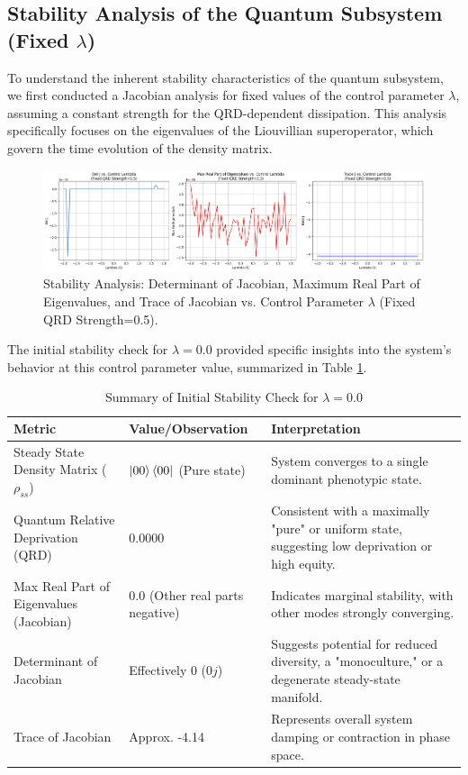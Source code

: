 \documentclass[9pt]{article}
\begin{document}
\subsection{Stability Analysis of the Quantum Subsystem (Fixed $\lambda$)}
To understand the inherent stability characteristics of the quantum subsystem, we first conducted a Jacobian analysis for fixed values of the control parameter $\lambda$, assuming a constant strength for the QRD-dependent dissipation. This analysis specifically focuses on the eigenvalues of the Liouvillian superoperator, which govern the time evolution of the density matrix.

\begin{figure}[h!]
    \centering
    \includegraphics[width=\textwidth]{phenotourfig1.png}
    \caption{Stability Analysis: Determinant of Jacobian, Maximum Real Part of Eigenvalues, and Trace of Jacobian vs. Control Parameter $\lambda$ (Fixed QRD Strength=0.5).}
    \label{fig:jac_eigenvalues_fixed_lambda}
\end{figure}

The initial stability check for $\lambda=0.0$ provided specific insights into the system's behavior at this control parameter value, summarized in Table \ref{tab:initial_stability_check}.

\begin{table}[h!]
    \centering
    \caption{Summary of Initial Stability Check for $\lambda=0.0$}
    \label{tab:initial_stability_check}
    \begin{tabularx}{\textwidth}{p{} | X | X}
    \toprule
        \textbf{Metric} & \textbf{Value/Observation} & \textbf{Interpretation} \\
    \midrule
        Steady State Density Matrix ($\rho_{ss}$) & $\ket{00}\bra{00}$ (Pure state) & System converges to a single dominant phenotypic state. \\
    Quantum Relative Deprivation (QRD) & 0.0000 & Consistent with a maximally "pure" or uniform state, suggesting low deprivation or high equity. \\
        Max Real Part of Eigenvalues (Jacobian) & 0.0 (Other real parts negative) & Indicates marginal stability, with other modes strongly converging. \\
        Determinant of Jacobian & Effectively 0 ($0j$) & Suggests potential for reduced diversity, a "monoculture," or a degenerate steady-state manifold. \\
    Trace of Jacobian   & Approx. -4.14 & Represents overall system damping or contraction in phase space. \\
    \bottomrule
\end{tabularx}
\end{table}
\end{document}
